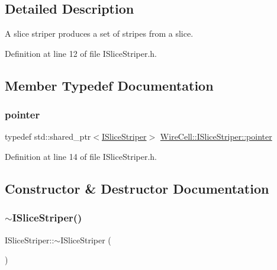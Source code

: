 \subsection{Detailed Description}
A slice striper produces a set of stripes from a slice. 

Definition at line 12 of file I\+Slice\+Striper.\+h.



\subsection{Member Typedef Documentation}
\mbox{\label{class_wire_cell_1_1_i_slice_striper_a3a3fd737fcef60317748e1d4199dc38a}} 
\subsubsection{\texorpdfstring{pointer}{pointer}}
{\footnotesize\ttfamily typedef std\+::shared\+\_\+ptr$<$\hyperlink{class_wire_cell_1_1_i_slice_striper}{I\+Slice\+Striper}$>$ \hyperlink{class_wire_cell_1_1_i_slice_striper_a3a3fd737fcef60317748e1d4199dc38a}{Wire\+Cell\+::\+I\+Slice\+Striper\+::pointer}}



Definition at line 14 of file I\+Slice\+Striper.\+h.



\subsection{Constructor \& Destructor Documentation}
\mbox{\label{class_wire_cell_1_1_i_slice_striper_a191d677061b12c9adb0e6e7e3c47e9bc}} 
\subsubsection{\texorpdfstring{$\sim$\+I\+Slice\+Striper()}{~ISliceStriper()}}
{\footnotesize\ttfamily I\+Slice\+Striper\+::$\sim$\+I\+Slice\+Striper (\begin{DoxyParamCaption}{ }\end{DoxyParamCaption})\hspace{0.3cm}{\ttfamily [virtual]}}



